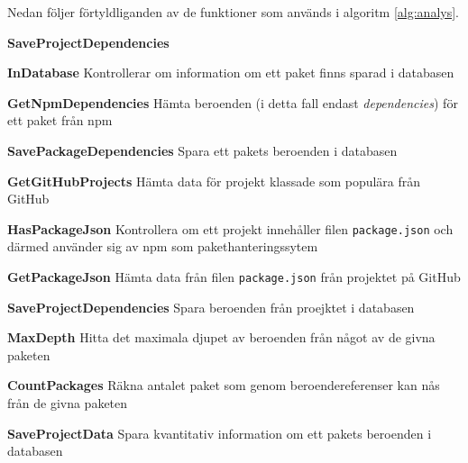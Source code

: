 Nedan följer förtyldliganden av de funktioner som används i algoritm \ref{alg:analys}.

\begin{labeling}{\textbf{SaveProjectDependencies}}
  \item [\textbf{InDatabase}] Kontrollerar om information om ett paket finns sparad i databasen
  \item [\textbf{GetNpmDependencies}] Hämta beroenden (i detta fall endast \textit{dependencies}) för ett paket från npm
  \item [\textbf{SavePackageDependencies}] Spara ett pakets beroenden i databasen
  \item [\textbf{GetGitHubProjects}] Hämta data för projekt klassade som populära från GitHub
  \item [\textbf{HasPackageJson}] Kontrollera om ett projekt innehåller filen \texttt{package.json} och därmed använder sig av npm som pakethanteringssytem
  \item [\textbf{GetPackageJson}] Hämta data från filen \texttt{package.json} från projektet på GitHub
  \item [\textbf{SaveProjectDependencies}] Spara beroenden från proejktet i databasen
  \item [\textbf{MaxDepth}] Hitta det maximala djupet av beroenden från något av de givna paketen
  \item [\textbf{CountPackages}] Räkna antalet paket som genom beroendereferenser kan nås från de givna paketen
  \item [\textbf{SaveProjectData}] Spara kvantitativ information om ett pakets beroenden i databasen
\end{labeling}
